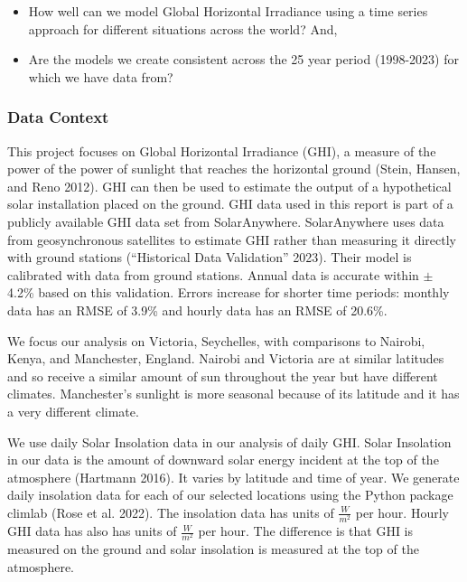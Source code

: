 \documentclass[
  letterpaper,
  DIV=11,
  numbers=noendperiod]{scrartcl}
\providecommand{\tightlist}{%
  \setlength{\itemsep}{0pt}\setlength{\parskip}{0pt}}\usepackage{longtable,booktabs,array}
\begin{document}
\begin{itemize}
\tightlist
\item
  How well can we model Global Horizontal Irradiance using a time series
  approach for different situations across the world? And,
\item
  Are the models we create consistent across the 25 year period
  (1998-2023) for which we have data from?
\end{itemize}

\hypertarget{data-context}{%
\subsubsection{Data Context}\label{data-context}}

This project focuses on Global Horizontal Irradiance (GHI), a measure of
the power of the power of sunlight that reaches the horizontal ground
(Stein, Hansen, and Reno 2012). GHI can then be used to estimate the
output of a hypothetical solar installation placed on the ground. GHI
data used in this report is part of a publicly available GHI data set
from SolarAnywhere. SolarAnywhere uses data from geosynchronous
satellites to estimate GHI rather than measuring it directly with ground
stations ({``Historical Data Validation''} 2023). Their model is
calibrated with data from ground stations. Annual data is accurate
within \(\pm\) 4.2\% based on this validation. Errors increase for
shorter time periods: monthly data has an RMSE of 3.9\% and hourly data
has an RMSE of 20.6\%.

We focus our analysis on Victoria, Seychelles, with comparisons to
Nairobi, Kenya, and Manchester, England. Nairobi and Victoria are at
similar latitudes and so receive a similar amount of sun throughout the
year but have different climates. Manchester's sunlight is more seasonal
because of its latitude and it has a very different climate.

We use daily Solar Insolation data in our analysis of daily GHI. Solar
Insolation in our data is the amount of downward solar energy incident
at the top of the atmosphere (Hartmann 2016). It varies by latitude and
time of year. We generate daily insolation data for each of our selected
locations using the Python package climlab (Rose et al. 2022). The
insolation data has units of \(\frac{W}{m^2}\) per hour. Hourly GHI data
has also has units of \(\frac{W}{m^2}\) per hour. The difference is that
GHI is measured on the ground and solar insolation is measured at the
top of the atmosphere.
\end{document}
